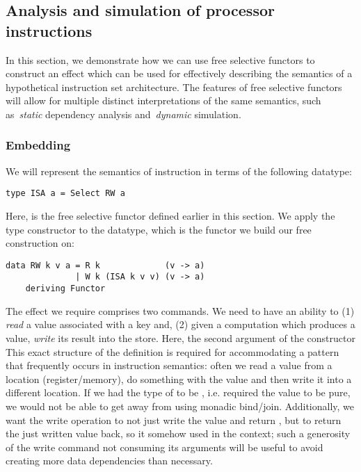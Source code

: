 \subsection{Analysis and simulation of processor instructions}

In this section, we demonstrate how we can use free selective functors to construct an
effect which can be used for effectively describing the semantics of a hypothetical
instruction set architecture. The features of free selective functors will allow for
multiple distinct interpretations of the same semantics, such as~\emph{static} dependency
analysis and~\emph{dynamic} simulation.

\subsubsection{Embedding}

We will represent the semantics of instruction in terms of the following datatype:

\begin{verbatim}
type ISA a = Select RW a
\end{verbatim}

Here,  is the free selective functor defined earlier in this section.
We apply the  type constructor to the  datatype, which is the
functor we build our free construction on:

\begin{verbatim}
data RW k v a = R k             (v -> a)
              | W k (ISA k v v) (v -> a)
    deriving Functor
\end{verbatim}

The effect we require comprises two commands. We need to have an ability to (1)
\emph{read} a value associated with a key and, (2) given a computation which produces a value,
\emph{write} its result into the store. Here, the second argument of the  constructor
This exact structure of the definition is required for accommodating a pattern that
frequently occurs in instruction semantics: often we read a value from a location
(register/memory), do something with the value and then write it into a different location.
If we had the type of  to be , i.e. required the value to be pure,
we would not be able to get away from using monadic bind/join. Additionally, we want the write
operation to not just write the value and return \hs{()}, but to return the just written value
back, so it somehow used in the context; such a generosity of the write command not consuming
its arguments will be useful to avoid creating more data dependencies than necessary.


